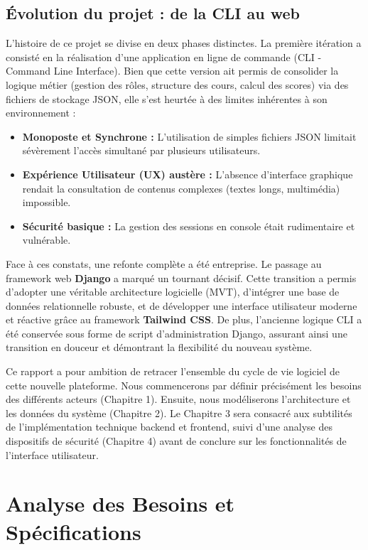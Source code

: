 \documentclass[12pt,a4paper]{report}
\begin{document}
\section*{Évolution du projet : de la CLI au web}

L'histoire de ce projet se divise en deux phases distinctes. La première itération a consisté en la réalisation d'une application en ligne de commande (CLI - Command Line Interface). Bien que cette version ait permis de consolider la logique métier (gestion des rôles, structure des cours, calcul des scores) via des fichiers de stockage JSON, elle s'est heurtée à des limites inhérentes à son environnement :
\begin{itemize}
    \item \textbf{Monoposte et Synchrone :} L'utilisation de simples fichiers JSON limitait sévèrement l'accès simultané par plusieurs utilisateurs.
    \item \textbf{Expérience Utilisateur (UX) austère :} L'absence d'interface graphique rendait la consultation de contenus complexes (textes longs, multimédia) impossible.
    \item \textbf{Sécurité basique :} La gestion des sessions en console était rudimentaire et vulnérable.
\end{itemize}

Face à ces constats, une refonte complète a été entreprise. Le passage au framework web \textbf{Django} a marqué un tournant décisif. Cette transition a permis d'adopter une véritable architecture logicielle (MVT), d'intégrer une base de données relationnelle robuste, et de développer une interface utilisateur moderne et réactive grâce au framework \textbf{Tailwind CSS}. De plus, l'ancienne logique CLI a été conservée sous forme de script d'administration Django, assurant ainsi une transition en douceur et démontrant la flexibilité du nouveau système.

Ce rapport a pour ambition de retracer l'ensemble du cycle de vie logiciel de cette nouvelle plateforme. Nous commencerons par définir précisément les besoins des différents acteurs (Chapitre 1). Ensuite, nous modéliserons l'architecture et les données du système (Chapitre 2). Le Chapitre 3 sera consacré aux subtilités de l'implémentation technique backend et frontend, suivi d'une analyse des dispositifs de sécurité (Chapitre 4) avant de conclure sur les fonctionnalités de l'interface utilisateur.

\chapter{Analyse des Besoins et Spécifications}
\end{document}
